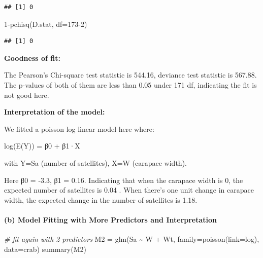 \documentclass[
]{article}
\newenvironment{Shaded}{\begin{snugshade}}{\end{snugshade}}
\newcommand{\AttributeTok}[1]{\textcolor[rgb]{0.77,0.63,0.00}{#1}}
\newcommand{\CommentTok}[1]{\textcolor[rgb]{0.56,0.35,0.01}{\textit{#1}}}
\newcommand{\DecValTok}[1]{\textcolor[rgb]{0.00,0.00,0.81}{#1}}
\newcommand{\FunctionTok}[1]{\textcolor[rgb]{0.00,0.00,0.00}{#1}}
\newcommand{\NormalTok}[1]{#1}
\newcommand{\OtherTok}[1]{\textcolor[rgb]{0.56,0.35,0.01}{#1}}
\newcommand{\SpecialCharTok}[1]{\textcolor[rgb]{0.00,0.00,0.00}{#1}}
\begin{document}
\begin{verbatim}
## [1] 0
\end{verbatim}

\begin{Shaded}
\begin{Highlighting}[]
\DecValTok{1}\SpecialCharTok{{-}}\FunctionTok{pchisq}\NormalTok{(D.stat, }\AttributeTok{df=}\DecValTok{173{-}2}\NormalTok{)}
\end{Highlighting}
\end{Shaded}

\begin{verbatim}
## [1] 0
\end{verbatim}

\textbf{Goodness of fit:}

The Pearson's Chi-square test statistic is 544.16, deviance test
statistic is 567.88. The p-values of both of them are less than 0.05
under 171 df, indicating the fit is not good here.

\textbf{Interpretation of the model:}

We fitted a poisson log linear model here where:

log(E(Y)) = β0 + β1·X

with Y=Sa (number of satellites), X=W (carapace width).

Here β0 = -3.3, β1 = 0.16. Indicating that when the carapace width is 0,
the expected number of satellites is 0.04 . When there's one unit change
in carapace width, the expected change in the number of satellites is
1.18.

\hypertarget{b-model-fitting-with-more-predictors-and-interpretation}{%
\paragraph{(b) Model Fitting with More Predictors and
Interpretation}\label{b-model-fitting-with-more-predictors-and-interpretation}}

\begin{Shaded}
\begin{Highlighting}[]
\CommentTok{\# fit again with 2 predictors}
\NormalTok{M2 }\OtherTok{=} \FunctionTok{glm}\NormalTok{(Sa }\SpecialCharTok{\textasciitilde{}}\NormalTok{ W }\SpecialCharTok{+}\NormalTok{ Wt, }\AttributeTok{family=}\FunctionTok{poisson}\NormalTok{(}\AttributeTok{link=}\NormalTok{log), }\AttributeTok{data=}\NormalTok{crab)}
\FunctionTok{summary}\NormalTok{(M2)}
\end{Highlighting}
\end{Shaded}
\end{document}
